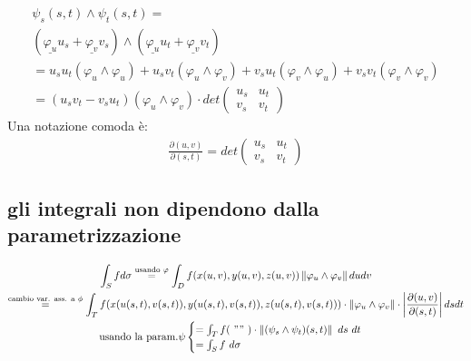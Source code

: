 \documentclass[a4paper, oneside]{article}
\begin{document}
\begin{gather*}
  \psi_s (s,t) \land \psi_t (s,t) = \\
  \left( \underline{\varphi_u} u_s + \underline{\varphi_v} v_s \right) \land \left( \underline{\varphi_u} u_t + \underline{\varphi_v} v_t \right)\\
  = u_s u_t ( \varphi_u \land \varphi_u ) + u_s v_t ( \varphi_u \land \varphi_v ) + v_s u_t ( \varphi_v \land \varphi_u ) + v_s v_t ( \varphi_v \land \varphi_v )\\
  = (u_s v_t - v_s u_t) ( \varphi_u \land \varphi_v )
   \cdot det \begin{pmatrix}
    u_s & u_t\\
    v_s & v_t
  \end{pmatrix}
\end{gather*}
Una notazione comoda è:
\begin{gather*}
  \frac{\partial (u,v)}{\partial (s,t)} = det \begin{pmatrix}
    u_s & u_t\\
    v_s & v_t
  \end{pmatrix}
\end{gather*}

\subsection{gli integrali non dipendono dalla parametrizzazione}
\begin{gather*}
  \int_S f d\sigma \overset{\text{usando } \varphi}{=} \int_D f(x(u,v), y(u,v), z(u,v)) \left\lVert \varphi_u \land \varphi_v \right\rVert dudv\\
  \overset{\text{cambio var. ass. a } \phi}{=} \int_T f(x(u(s,t), v(s,t)), y(u(s,t), v(s,t)), z(u(s,t), v(s,t))) \cdot \left\lVert \varphi_u \land \varphi_v \right\rVert \cdot \left| \frac{\partial (u,v)}{\partial (s,t)} \right| dsdt\\
  \text{usando la param.} \psi \begin{cases}
    = \int_T f( \ "" \ ) \cdot \left\lVert (\psi_s \land \psi_t) (s,t) \right\rVert \ ds \ dt\\
    = \int_S f \ d\sigma
  \end{cases}
\end{gather*}
\end{document}

